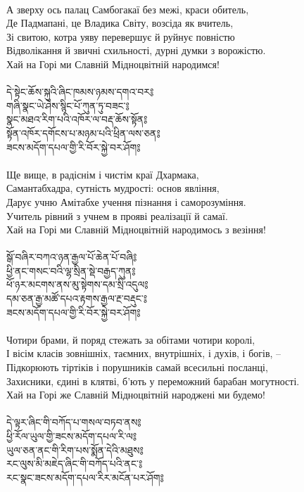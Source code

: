 \\
А зверху ось палац Самбогакаї без межі, краси обитель,\\
Де Падмапані, це Владика Світу, возсіда як вчитель,\\
Зі свитою, котра уяву перевершує й руйнує повністю\\
Відволікання й звичні схильності, дурні думки з ворожістю.\\
Хай на Горі ми Славній Мідноцвітній народимся!\\
\\
{\ti དེ་སྟེང་ཆོས་སྐུའི་ཞིང་ཁམས་ཉམས་དགའ་བར༔\\
གཞི་སྣང་ཡེ་ཤེས་སྙིང་པོ་ཀུན་ཏུ་བཟང་༔\\
སྣང་མཐའ་རིག་པའི་འཁོར་ལ་བརྡ་ཆོས་སྟོན༔\\
སྟོན་འཁོར་དགོངས་པ་མཉམ་པའི་ཕྲིན་ལས་ཅན༔\\
ཟངས་མདོག་དཔལ་གྱི་རི་བོར་སྐྱེ་བར་ཤོག༔}\\
\\
\ru
Ще вище, в радіснім і чистім краї Дхармака,\\
Самантабхадра, сутність мудрості: основ явління,\\
Дарує учню Амітабхе учення пізнання і саморозуміння.\\
Учитель рівний з учнем в прояві реалізації й самаї.\\
Хай на Горі ми Славній Мідноцвітній народимось з везіння!\\
\\
{\ti སྒོ་བཞིར་བཀའ་ཉན་རྒྱལ་པོ་ཆེན་པོ་བཞི༔\\
ཕྱི་ནང་གསང་བའི་ལྷ་སྲིན་སྡེ་བརྒྱད་ཀུན༔\\
ཕོ་ཉར་མངགས་ནས་མུ་སྟེགས་དམ་སྲི་འདུལ༔\\
དམ་ཅན་རྒྱ་མཚོ་དཔའ་རྟགས་རྒྱལ་རྔ་བརྡུང་༔\\
ཟངས་མདོག་དཔལ་གྱི་རི་བོར་སྐྱེ་བར་ཤོག༔}\\
\\
\ru
Чотири брами, й поряд стежать за обітами чотири королі,\\
І вісім класів зовнішніх, таємних, внутрішніх, і духів, і богів, --\\
Підкорюють тіртіків і порушників самай всесильні посланці,\\
Захисники, єдині в клятві, б'ють у переможний барабан могутності.\\
Хай на Горі же Славній Мідноцвітній народжені ми будемо!\\
\\
\newpage
{\ti དེ་ལྟར་ཞིང་གི་བཀོད་པ་གསལ་བཏབ་ནས༔\\
ཕྱི་རོལ་ཡུལ་གྱི་ཟངས་མདོག་དཔལ་རི་ལ༔\\
ཡུལ་ཅན་ནང་གི་རིག་པས་སྨོན་དེའི་མཐུས༔\\
རང་ལུས་མི་མཇེད་ཞིང་གི་བཀོད་པའི་ནང་༔\\
རང་སྣང་ཟངས་མདོག་དཔལ་རིར་མངོན་པར་ཤོག༔}\\
